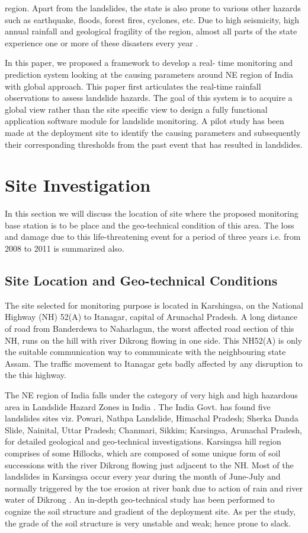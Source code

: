 \documentclass[conference]{IEEEtran}
\begin{document}
region. Apart from the landslides, the state is also prone to
various other hazards such as earthquake, floods, forest fires,
cyclones, etc. Due to high seismicity, high annual rainfall and
geological fragility of the region, almost all parts of the state
experience one or more of these disasters every year \cite{arun}.
\par
In this paper, we proposed a framework to develop a real-
time monitoring and prediction system looking at the causing
parameters around NE region of India with global approach.
This paper first articulates the real-time rainfall observations to
assess landslide hazards. The goal of this system is to acquire
a global view rather than the site specific view to design
a fully functional application software module for landslide
monitoring. A pilot study has been made at the deployment
site to identify the causing parameters and subsequently their
corresponding thresholds from the past event that has resulted
in landslides.

\section{Site Investigation}
In this section we will discuss the location of site where the proposed monitoring base station is to be place and the
geo-technical condition of this area. The loss and damage due to this life-threatening event for a period of three years i.e. from 2008 to 2011 is summarized also.

\subsection{Site Location and Geo-technical Conditions}
The site selected for monitoring purpose is located in Karshingsa, on the National Highway (NH) 52(A) to Itanagar, capital of Arunachal Pradesh. A long distance of road from Banderdewa to Naharlagun, the worst affected road section of
this NH, runs on the hill with river Dikrong flowing in one side. This NH52(A) is only the suitable communication way
to communicate with the neighbouring state Assam. The traffic movement to Itanagar gets badly affected by any disruption to the this highway.
\par
The NE region of India falls under the category of very high and high hazardous area in Landslide Hazard Zones in India \cite{lodhi}. The India Govt. has found five landslides sites viz. Powari, Nathpa Landslide, Himachal Pradesh; Sherka Danda Slide, Nainital, Uttar Pradesh; Chanmari, Sikkim; Karsingsa, Arunachal Pradesh, for detailed geological and geo-technical investigations. Karsingsa hill region comprises of some Hillocks, which are composed of some unique form of soil successions with the river Dikrong flowing just adjacent to the NH. Most of the landslides in Karsingsa occur every year during the month of June-July and normally triggered by the toe erosion at river bank due to action of rain and river water of Dikrong \cite{jotisankasa}. An in-depth geo-technical study has been performed to cognize the soil structure and gradient of the deployment site. As per the study, the grade of the soil structure is very unstable and weak; hence prone to slack.
\end{document}
